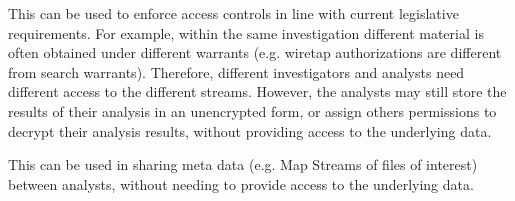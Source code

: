 \documentclass[10pt, conference]{IEEEtran}
\begin{document}
{{This can be used to enforce access controls in line with current
legislative requirements. For example, within the same investigation
different material is often obtained under different warrants
(e.g. wiretap authorizations are different from search
warrants). Therefore, different investigators and analysts need
different access to the different streams. However, the analysts may
still store the results of their analysis in an unencrypted form, or
assign others permissions to decrypt their analysis results, without
providing access to the underlying data. 

This can be used in sharing meta data (e.g. Map Streams of files of
interest) between analysts, without needing to provide access to the
underlying data.





}}
\end{document}
